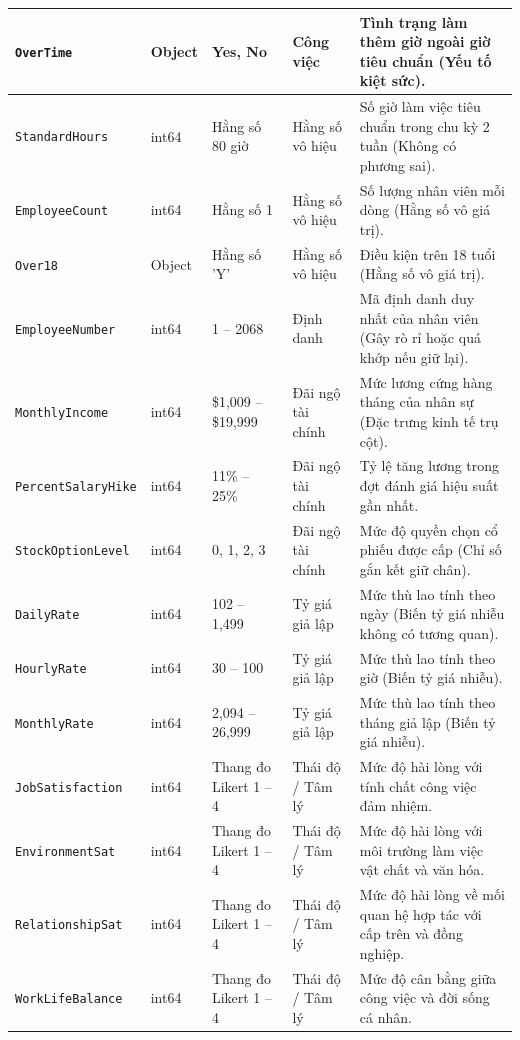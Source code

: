 \documentclass[12pt,a4paper]{article}
\begin{document}
\begin{table}[H]
\begin{tabular}{|l|l|l|l|p{6.5cm}|}
\hline
\texttt{OverTime} & Object & Yes, No & Công việc & Tình trạng làm thêm giờ ngoài giờ tiêu chuẩn (Yếu tố kiệt sức). \\
\hline
\texttt{StandardHours} & int64 & Hằng số 80 giờ & Hằng số vô hiệu & Số giờ làm việc tiêu chuẩn trong chu kỳ 2 tuần (Không có phương sai). \\
\hline
\texttt{EmployeeCount} & int64 & Hằng số 1 & Hằng số vô hiệu & Số lượng nhân viên mỗi dòng (Hằng số vô giá trị). \\
\hline
\texttt{Over18} & Object & Hằng số 'Y' & Hằng số vô hiệu & Điều kiện trên 18 tuổi (Hằng số vô giá trị). \\
\hline
\texttt{EmployeeNumber} & int64 & 1 -- 2068 & Định danh & Mã định danh duy nhất của nhân viên (Gây rò rỉ hoặc quá khớp nếu giữ lại). \\
\hline
\texttt{MonthlyIncome} & int64 & \$1,009 -- \$19,999 & Đãi ngộ tài chính & Mức lương cứng hàng tháng của nhân sự (Đặc trưng kinh tế trụ cột). \\
\hline
\texttt{PercentSalaryHike}& int64 & 11\% -- 25\% & Đãi ngộ tài chính & Tỷ lệ tăng lương trong đợt đánh giá hiệu suất gần nhất. \\
\hline
\texttt{StockOptionLevel} & int64 & 0, 1, 2, 3 & Đãi ngộ tài chính & Mức độ quyền chọn cổ phiếu được cấp (Chỉ số gắn kết giữ chân). \\
\hline
\texttt{DailyRate} & int64 & 102 -- 1,499 & Tỷ giá giả lập & Mức thù lao tính theo ngày (Biến tỷ giá nhiễu không có tương quan). \\
\hline
\texttt{HourlyRate} & int64 & 30 -- 100 & Tỷ giá giả lập & Mức thù lao tính theo giờ (Biến tỷ giá nhiễu). \\
\hline
\texttt{MonthlyRate} & int64 & 2,094 -- 26,999 & Tỷ giá giả lập & Mức thù lao tính theo tháng giả lập (Biến tỷ giá nhiễu). \\
\hline
\texttt{JobSatisfaction} & int64 & Thang đo Likert 1 -- 4 & Thái độ / Tâm lý & Mức độ hài lòng với tính chất công việc đảm nhiệm. \\
\hline
\texttt{EnvironmentSat} & int64 & Thang đo Likert 1 -- 4 & Thái độ / Tâm lý & Mức độ hài lòng với môi trường làm việc vật chất và văn hóa. \\
\hline
\texttt{RelationshipSat} & int64 & Thang đo Likert 1 -- 4 & Thái độ / Tâm lý & Mức độ hài lòng về mối quan hệ hợp tác với cấp trên và đồng nghiệp. \\
\hline
\texttt{WorkLifeBalance} & int64 & Thang đo Likert 1 -- 4 & Thái độ / Tâm lý & Mức độ cân bằng giữa công việc và đời sống cá nhân. \\

\end{tabular}
\end{table}
\end{document}
